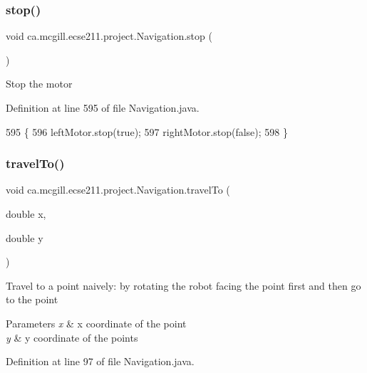 \subsubsection{\texorpdfstring{stop()}{stop()}}
{\footnotesize\ttfamily void ca.\+mcgill.\+ecse211.\+project.\+Navigation.\+stop (\begin{DoxyParamCaption}{ }\end{DoxyParamCaption})}

Stop the motor 

Definition at line 595 of file Navigation.\+java.


\begin{DoxyCode}
595                      \{
596     leftMotor.stop(\textcolor{keyword}{true});
597     rightMotor.stop(\textcolor{keyword}{false});
598   \}
\end{DoxyCode}
\mbox{\label{classca_1_1mcgill_1_1ecse211_1_1project_1_1_navigation_ad89b3dd084d81b4ec4d89ea73ba13eaa}} 
\subsubsection{\texorpdfstring{travel\+To()}{travelTo()}}
{\footnotesize\ttfamily void ca.\+mcgill.\+ecse211.\+project.\+Navigation.\+travel\+To (\begin{DoxyParamCaption}\item[{double}]{x,  }\item[{double}]{y }\end{DoxyParamCaption})}

Travel to a point naively\+: by rotating the robot facing the point first and then go to the point


\begin{DoxyParams}{Parameters}
{\em x} & x coordinate of the point \\
\hline
{\em y} & y coordinate of the points \\
\hline
\end{DoxyParams}


Definition at line 97 of file Navigation.\+java.


